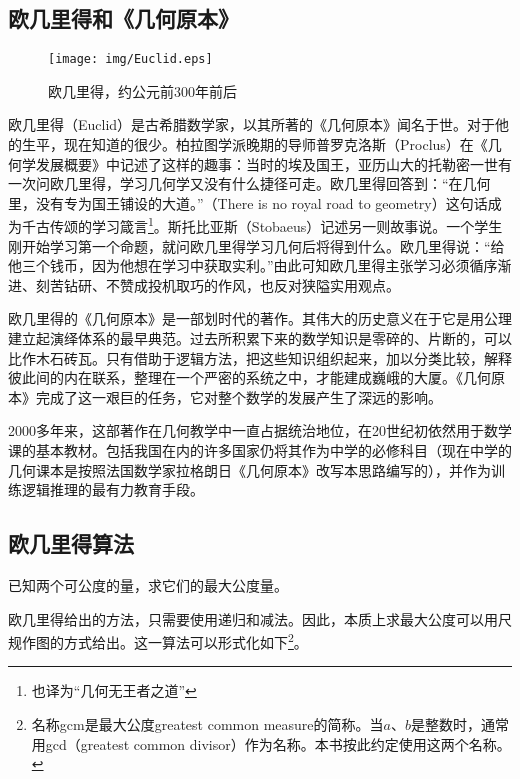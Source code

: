 \documentclass[UTF8]{article}
\begin{document}
\subsection{欧几里得和《几何原本》}

\begin{wrapfigure}{R}{0.4\textwidth}
 \centering
 \texttt{[image: img/Euclid.eps]}
 \captionsetup{labelformat=empty}
 \caption{欧几里得，约公元前300年前后}
 \label{fig:Euclid}
\end{wrapfigure}

欧几里得（Euclid）是古希腊数学家，以其所著的《几何原本》闻名于世。对于他的生平，现在知道的很少。柏拉图学派晚期的导师普罗克洛斯（Proclus）在《几何学发展概要》中记述了这样的趣事：当时的埃及国王，亚历山大的托勒密一世有一次问欧几里得，学习几何学又没有什么捷径可走。欧几里得回答到：“在几何里，没有专为国王铺设的大道。”（There is no royal road to geometry）这句话成为千古传颂的学习箴言\footnote{也译为“几何无王者之道”}。斯托比亚斯（Stobaeus）记述另一则故事说。一个学生刚开始学习第一个命题，就问欧几里得学习几何后将得到什么。欧几里得说：“给他三个钱币，因为他想在学习中获取实利。”由此可知欧几里得主张学习必须循序渐进、刻苦钻研、不赞成投机取巧的作风，也反对狭隘实用观点\cite{Elements}。

欧几里得的《几何原本》是一部划时代的著作。其伟大的历史意义在于它是用公理建立起演绎体系的最早典范。过去所积累下来的数学知识是零碎的、片断的，可以比作木石砖瓦。只有借助于逻辑方法，把这些知识组织起来，加以分类比较，解释彼此间的内在联系，整理在一个严密的系统之中，才能建成巍峨的大厦。《几何原本》完成了这一艰巨的任务，它对整个数学的发展产生了深远的影响。

2000多年来，这部著作在几何教学中一直占据统治地位，在20世纪初依然用于数学课的基本教材。包括我国在内的许多国家仍将其作为中学的必修科目（现在中学的几何课本是按照法国数学家拉格朗日《几何原本》改写本思路编写的），并作为训练逻辑推理的最有力教育手段\cite{HanXueTao16}。

\subsection{欧几里得算法}

\begin{proposition}
已知两个可公度的量，求它们的最大公度量。
\end{proposition}

欧几里得给出的方法，只需要使用递归和减法。因此，本质上求最大公度可以用尺规作图的方式给出。这一算法可以形式化如下\footnote{名称gcm是最大公度greatest common measure的简称。当$a$、$b$是整数时，通常用gcd（greatest common divisor）作为名称。本书按此约定使用这两个名称。}。
\end{document}

